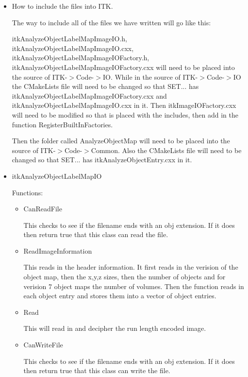 \documentclass{InsightArticle}
\begin{document}
\begin{itemize}
\item How to include the files into ITK.

The way to include all of the files we have written will go like this:

itkAnalyzeObjectLabelMapImageIO.h, itkAnalyzeObjectLabelMapImageIO.cxx, itkAnalyzeObjectLabelMapImageIOFactory.h, itkAnalyzeObjectLabelMapImageIOFactory.cxx will need to be placed into the source of ITK-$>$Code-$>$IO.  While in the source of ITK-$>$Code-$>$IO the CMakeLists file will need to be changed so that SET{...} has itkAnalyzeObjectLabelMapImageIOFactory.cxx and itkAnalyzeObjectLabelMapImageIO.cxx in it.  Then itkImageIOFactory.cxx will need to be modified so that  is placed with the includes, then add  in the function RegisterBuiltInFactories.

Then the folder called AnalyzeObjectMap will need to be placed into the source of ITK-$>$Code-$>$Common.  Also the CMakeLists file will need to be changed so that SET{...} has itkAnalyzeObjectEntry.cxx in it.

\item itkAnalyzeObjectLabelMapIO

Functions:
\begin{itemize}
\item CanReadFile

This checks to see if the filename ends with an obj extension.  If it does then return true that this class can read the file.

\item ReadImageInformation

This reads in the header information.  It first reads in the verision of the object map, then the x,y,z sizes, then the number of objects and for verision 7 object maps the number of volumes.  Then the function reads in each object entry and stores them into a vector of object entries.

\item Read

This will read in and decipher the run length encoded image.

\item CanWriteFile

This checks to see if the filename ends with an obj extension.  If it does then return true that this class can write the file.


\end{itemize}
\end{itemize}
\end{document}
